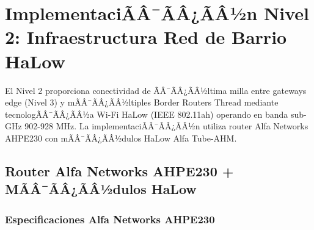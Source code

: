 \section{ImplementaciÃÂ¯ÃÂ¿ÃÂ½n Nivel 2: Infraestructura Red de Barrio HaLow}
\label{sec:impl-nivel2-halow}

El Nivel 2 proporciona conectividad de ÃÂ¯ÃÂ¿ÃÂ½ltima milla entre gateways edge (Nivel 3) y mÃÂ¯ÃÂ¿ÃÂ½ltiples Border Routers Thread mediante tecnologÃÂ¯ÃÂ¿ÃÂ½a Wi-Fi HaLow (IEEE 802.11ah) operando en banda sub-GHz 902-928 MHz. La implementaciÃÂ¯ÃÂ¿ÃÂ½n utiliza router Alfa Networks AHPE230 con mÃÂ¯ÃÂ¿ÃÂ½dulos HaLow Alfa Tube-AHM.

\subsection{Router Alfa Networks AHPE230 + MÃÂ¯ÃÂ¿ÃÂ½dulos HaLow}
\label{sec:impl-halow-hardware}

\subsubsection{Especificaciones Alfa Networks AHPE230}

